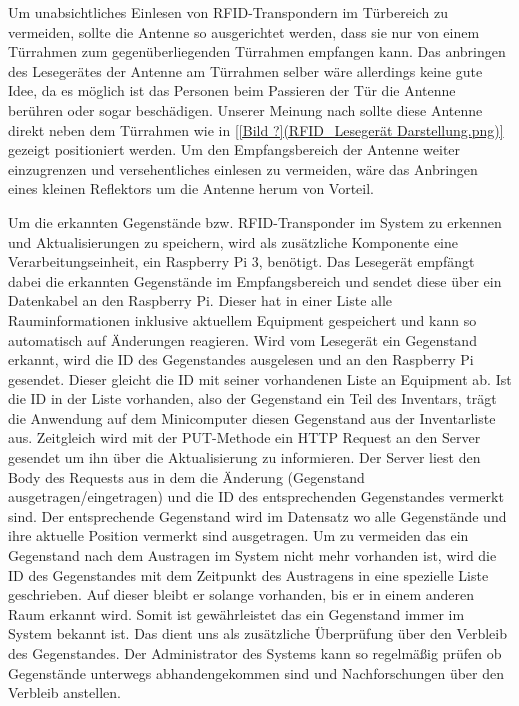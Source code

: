 Um unabsichtliches Einlesen von RFID-Transpondern im Türbereich zu vermeiden,
sollte die Antenne so ausgerichtet werden, dass sie nur von einem Türrahmen
zum gegenüberliegenden Türrahmen empfangen kann. Das anbringen des Lesegerätes \bzw
der Antenne am Türrahmen selber wäre allerdings keine gute Idee, da es möglich ist
das Personen beim Passieren der Tür die Antenne berühren oder sogar beschädigen.
Unserer Meinung nach sollte diese Antenne direkt neben dem Türrahmen wie in
\ref{[Bild ?](RFID_Lesegerät Darstellung.png)} gezeigt positioniert werden.
Um den Empfangsbereich der Antenne weiter einzugrenzen und versehentliches
einlesen zu vermeiden, wäre das Anbringen eines kleinen Reflektors um die
Antenne herum von Vorteil.

Um die erkannten Gegenstände bzw. RFID-Transponder im System zu erkennen und
Aktualisierungen zu speichern, wird als zusätzliche Komponente eine
Verarbeitungseinheit, \zB ein Raspberry Pi 3, benötigt. Das Lesegerät empfängt
dabei die erkannten Gegenstände im Empfangsbereich und sendet diese über ein
Datenkabel an den Raspberry Pi. Dieser hat in einer Liste alle
Rauminformationen inklusive aktuellem Equipment gespeichert und kann so
automatisch auf Änderungen reagieren. Wird vom Lesegerät ein Gegenstand
erkannt, wird die ID des Gegenstandes ausgelesen und an den Raspberry Pi
gesendet. Dieser gleicht die ID mit seiner vorhandenen Liste an Equipment ab. 
Ist die ID in der Liste vorhanden, also der Gegenstand ein Teil des Inventars,
trägt die Anwendung auf dem Minicomputer diesen Gegenstand aus der
Inventarliste aus. Zeitgleich wird mit der PUT-Methode ein HTTP Request an den
Server gesendet um ihn über die Aktualisierung zu informieren. Der Server liest
den Body des Requests aus in dem die Änderung (Gegenstand ausgetragen/eingetragen)
und die ID des entsprechenden Gegenstandes vermerkt sind. Der entsprechende
Gegenstand wird im Datensatz wo alle Gegenstände und ihre aktuelle Position
vermerkt sind ausgetragen. Um zu vermeiden das ein Gegenstand nach dem
Austragen im System nicht mehr vorhanden ist, wird die ID des Gegenstandes mit
dem Zeitpunkt des Austragens in eine spezielle Liste geschrieben. Auf dieser
bleibt er solange vorhanden, bis er in einem anderen Raum erkannt wird.
Somit ist gewährleistet das ein Gegenstand immer im System bekannt ist.
Das dient uns als zusätzliche Überprüfung über den Verbleib des Gegenstandes.
Der Administrator des Systems kann so regelmäßig prüfen ob Gegenstände
unterwegs abhandengekommen sind und Nachforschungen über den Verbleib anstellen.

